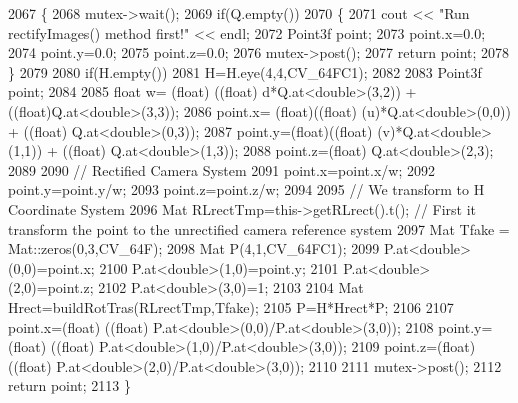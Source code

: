 \begin{DoxyCode}
2067 \{
2068     mutex->wait();
2069     \textcolor{keywordflow}{if}(Q.empty())
2070     \{
2071         cout << \textcolor{stringliteral}{"Run rectifyImages() method first!"} << endl;
2072         Point3f point;
2073         point.x=0.0;
2074         point.y=0.0;
2075         point.z=0.0;
2076         mutex->post();
2077         \textcolor{keywordflow}{return} point;
2078     \}
2079 
2080     \textcolor{keywordflow}{if}(H.empty())
2081         H=H.eye(4,4,CV\_64FC1);
2082 
2083     Point3f point;
2084 
2085     \textcolor{keywordtype}{float} w= (float) ((\textcolor{keywordtype}{float}) d*Q.at<\textcolor{keywordtype}{double}>(3,2)) + ((float)Q.at<\textcolor{keywordtype}{double}>(3,3));
2086     point.x= (float)((\textcolor{keywordtype}{float}) (u)*Q.at<\textcolor{keywordtype}{double}>(0,0)) + ((\textcolor{keywordtype}{float}) Q.at<\textcolor{keywordtype}{double}>(0,3));
2087     point.y=(float)((\textcolor{keywordtype}{float}) (v)*Q.at<\textcolor{keywordtype}{double}>(1,1)) + ((\textcolor{keywordtype}{float}) Q.at<\textcolor{keywordtype}{double}>(1,3));
2088     point.z=(float) Q.at<\textcolor{keywordtype}{double}>(2,3);
2089 
2090     \textcolor{comment}{// Rectified Camera System}
2091     point.x=point.x/w;
2092     point.y=point.y/w;
2093     point.z=point.z/w;
2094 
2095     \textcolor{comment}{// We transform to H Coordinate System}
2096     Mat RLrectTmp=this->getRLrect().t(); \textcolor{comment}{// First it transform the point to the unrectified camera
       reference system}
2097     Mat Tfake = Mat::zeros(0,3,CV\_64F);
2098     Mat P(4,1,CV\_64FC1);
2099     P.at<\textcolor{keywordtype}{double}>(0,0)=point.x;
2100     P.at<\textcolor{keywordtype}{double}>(1,0)=point.y;
2101     P.at<\textcolor{keywordtype}{double}>(2,0)=point.z;
2102     P.at<\textcolor{keywordtype}{double}>(3,0)=1;
2103 
2104     Mat Hrect=buildRotTras(RLrectTmp,Tfake);
2105     P=H*Hrect*P;
2106 
2107     point.x=(float) ((\textcolor{keywordtype}{float}) P.at<\textcolor{keywordtype}{double}>(0,0)/P.at<\textcolor{keywordtype}{double}>(3,0));
2108     point.y=(float) ((\textcolor{keywordtype}{float}) P.at<\textcolor{keywordtype}{double}>(1,0)/P.at<\textcolor{keywordtype}{double}>(3,0));
2109     point.z=(float) ((\textcolor{keywordtype}{float}) P.at<\textcolor{keywordtype}{double}>(2,0)/P.at<\textcolor{keywordtype}{double}>(3,0));
2110 
2111     mutex->post();
2112     \textcolor{keywordflow}{return} point;
2113 \}
\end{DoxyCode}
